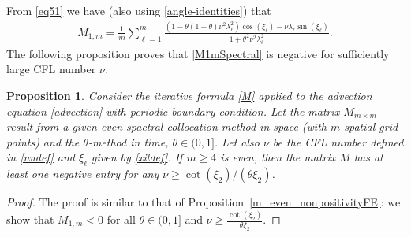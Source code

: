 \documentclass[a4paper]{article}
\newtheorem{proposition}{Proposition}
\newcommand{\rr}{\mathbb{R}}
\begin{document}
\begin{description}[style=unboxed,leftmargin=0cm]
\item [{Case 1:} $m$ is {even}.]
From \eqref{eq51} we have (also using \eqref{angle-identities}) that
\begin{align}\label{M1mSpectral}
	M_{1,m} = \frac{1}{m} \sum_{\ell=1}^{m} \frac{\left(1-\theta(1-\theta)\nu^2\lambda_\ell^2\right)
	\cos(\xi_\ell) - \nu\lambda_\ell\sin(\xi_\ell)}{1+\theta^2\nu^2\lambda_\ell^2}.
\end{align}
The following proposition proves that \eqref{M1mSpectral} is negative for sufficiently large CFL number $\nu$.
\begin{proposition}\label{m_even_nonpositivitySpectral}
	Consider the iterative formula \eqref{M} applied to the advection equation \eqref{advection} with periodic
	boundary condition.
	Let the matrix $M_{m \times m}$ result from a given even spactral collocation method in space (with $m$
	spatial grid points) and the $\theta$-method in time, $\theta \in (0,1]$.
	Let also $\nu$ be the CFL number defined in \eqref{nudef} and $\xi_\ell$ given by \eqref{xildef}.
	If $m \ge 4$ is \emph{even}, then the matrix $M$ has at least one negative entry for any
	$\nu \ge \cot(\xi_2)/(\theta \xi_2)$.
\end{proposition}
\begin{proof}
	The proof is similar to that of Proposition~\ref{m_even_nonpositivityFE}: we show that
	$M_{1,m}<0$ for all $\theta \in (0,1]$ and $\nu \ge \frac{\cot(\xi_2)}{\theta \xi_2}$.
	

\end{proof}
\end{description}
\end{document}
